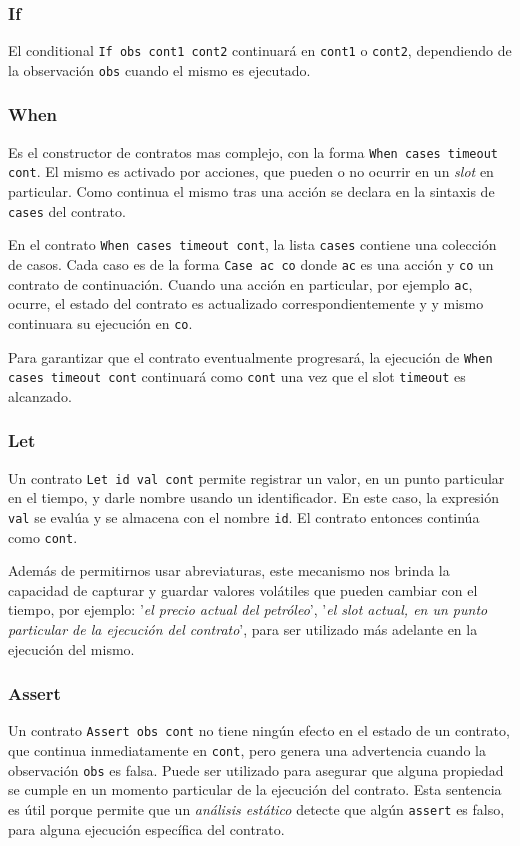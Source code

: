 \documentclass[12pt]{book}
\begin{document}
\subsubsection{If}
El conditional \texttt{If obs cont1 cont2} continuará en \texttt{cont1} o \texttt{cont2}, dependiendo de la observación \texttt{obs} cuando el mismo es ejecutado.

\subsubsection{When}
Es el constructor de contratos mas complejo, con la forma \texttt{When cases timeout cont}. El mismo es activado por acciones, que pueden o no ocurrir en un \textit{slot} en particular. Como continua el mismo tras una acción se declara en la sintaxis de \texttt{cases} del contrato.

En el contrato \texttt{When cases timeout cont}, la lista \texttt{cases} contiene una colección de casos. Cada caso es de la forma \texttt{Case ac co} donde \texttt{ac} es una acción y \texttt{co} un contrato de continuación. Cuando una acción en particular, por ejemplo \texttt{ac}, ocurre, el estado del contrato es actualizado correspondientemente y y mismo continuara su ejecución en \texttt{co}.

Para garantizar que el contrato eventualmente progresará, la ejecución de \texttt{When cases timeout cont} continuará como \texttt{cont} una vez que el slot \texttt{timeout} es alcanzado.

\subsubsection{Let}

Un contrato \texttt{Let id val cont} permite registrar un valor, en un punto particular en el tiempo, y darle nombre usando un identificador. En este caso, la expresión \texttt{val} se evalúa y se almacena con el nombre \texttt{id}. El contrato entonces continúa como \texttt{cont}.

Además de permitirnos usar abreviaturas, este mecanismo nos brinda la capacidad de capturar y guardar valores volátiles que pueden cambiar con el tiempo, por ejemplo: '\textit{el precio actual del petróleo}', '\textit{el slot actual, en un punto particular de la ejecución del contrato}', para ser utilizado más adelante en la ejecución del mismo.

\subsubsection{Assert}
Un contrato \texttt{Assert obs cont} no tiene ningún efecto en el estado de un contrato, que continua inmediatamente en \texttt{cont}, pero genera una advertencia cuando la observación \texttt{obs} es falsa. Puede ser utilizado para asegurar que alguna propiedad se cumple en un momento particular de la ejecución del contrato. Esta sentencia es útil porque permite que un \textit{análisis estático} detecte que algún \texttt{assert} es falso, para alguna ejecución específica del contrato.
\end{document}
